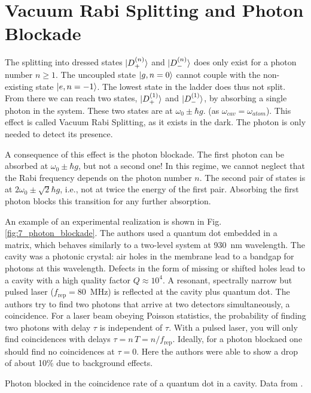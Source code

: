 \section{Vacuum Rabi Splitting and Photon Blockade}

The splitting into dressed states $\ket{D_+^{(n)}}$ and $\ket{D_-^{(n)}}$ does only exist for a photon number $n \ge 1$. The uncoupled state $\ket{g, n=0}$ cannot couple with the non-existing state   $\ket{e, n = -1}$. The lowest state in the ladder does thus not split. From there we can reach two states,  $\ket{D_+^{(1)}}$ and $\ket{D_-^{(1)}}$,
by absorbing a single photon in the system. These two states are at  $\omega_0 \pm \hbar g$. (as $\omega_{cav} = \omega_{atom}$). This effect is called Vacuum Rabi Splitting, as it exists in the dark. The photon is only needed to detect its presence.

A consequence of this effect is the photon blockade. The first photon can be absorbed at $\omega_0 \pm \hbar g$, but not a second one!  In this regime, we cannot neglect that the Rabi frequency depends on the photon number $n$. The second pair of states is at 
$2 \omega_0 \pm \sqrt{2} \hbar g$, i.e., not at twice the energy of the first pair. Absorbing the first photon blocks this transition for any further absorption.

An example of an experimental realization is shown in Fig. \ref{fig:7_photon_blockade}. The authors used a  quantum dot embedded in a  matrix, which behaves similarly to a two-level system at 930~nm wavelength. The cavity was a photonic crystal: air holes in the  membrane lead to a bandgap for photons at this wavelength. Defects in the form of missing or shifted holes lead to a cavity with a high quality factor $Q \approx 10^4$. A resonant, spectrally narrow but pulsed laser ($f_\text{rep} = 80 $~MHz) is reflected at the cavity plus quantum dot. The authors try to find two photons that arrive at two detectors simultaneously, a coincidence. For a laser beam obeying Poisson statistics, the probability of finding two photons with delay $\tau$ is independent of $\tau$. With a pulsed laser, you will only find coincidences with delays $\tau = n \, T = n / f_\text{rep}$.
Ideally, for a photon blockaed one should find no coincidences at $\tau = 0$. Here the authors were able to show a drop of about 10\% due to background effects.


\begin{marginfigure}
  \caption{Photon blocked in the coincidence rate of a quantum dot in a cavity. Data from 
  \cite{Faraon2008}.}
  \label{fig:7_photon_blockade}
\end{marginfigure}




